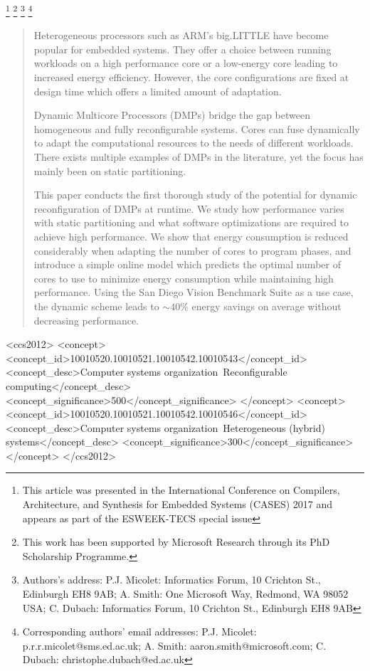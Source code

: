 \documentclass[format=acmsmall, review=false, screen=true]{acmart}
\begin{document}
\thanks{This article was presented in the International Conference on Compilers, Architecture, and Synthesis for Embedded Systems (CASES) 2017 and appears as part of the ESWEEK-TECS special issue}
\thanks{This work has been supported by Microsoft Research through its PhD Scholarship Programme.}
\thanks{Authors's address: P.J. Micolet: Informatics Forum, 10 Crichton St., Edinburgh EH8 9AB; A. Smith: One Microsoft Way, Redmond, WA 98052 USA; C. Dubach: Informatics Forum, 10 Crichton St., Edinburgh EH8 9AB}
\thanks{Corresponding authors' email addresses: P.J. Micolet: p.r.r.micolet@sms.ed.ac.uk; A. Smith: aaron.smith@microsoft.com; C. Dubach: christophe.dubach@ed.ac.uk}
\begin{abstract}

Heterogeneous processors such as ARM's big.LITTLE have become popular for embedded systems.
They offer a choice between running workloads on a high performance core or a low-energy core leading to increased energy efficiency.
However, the core configurations are fixed at design time which offers a limited amount of adaptation.

Dynamic Multicore Processors (DMPs) bridge the gap between homogeneous and fully reconfigurable systems.
Cores can fuse dynamically to adapt the computational resources to the needs of different workloads.
There exists multiple examples of DMPs in the literature, yet the focus has mainly been on static partitioning.

This paper conducts the first thorough study of the potential for dynamic reconfiguration of DMPs at runtime.
We study how performance varies with static partitioning and what software optimizations are required to achieve high performance.
We show that energy consumption is reduced considerably when adapting the number of cores to program phases, and introduce a simple online model which predicts the optimal number of cores to use to minimize energy consumption while maintaining high performance.
Using the San Diego Vision Benchmark Suite as a use case, the dynamic scheme leads to $\sim40\%$ energy savings on average without decreasing performance.


\end{abstract}

 \begin{CCSXML}
<ccs2012>
<concept>
<concept_id>10010520.10010521.10010542.10010543</concept_id>
<concept_desc>Computer systems organization~Reconfigurable computing</concept_desc>
<concept_significance>500</concept_significance>
</concept>
<concept>
<concept_id>10010520.10010521.10010542.10010546</concept_id>
<concept_desc>Computer systems organization~Heterogeneous (hybrid) systems</concept_desc>
<concept_significance>300</concept_significance>
</concept>
</ccs2012>
\end{CCSXML}
\end{document}
